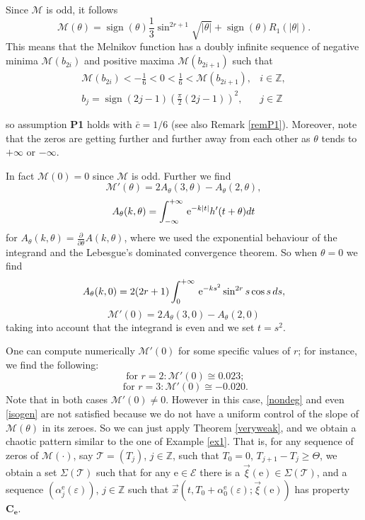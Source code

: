 \documentclass[10pt]{article}
\numberwithin{equation}{section}
\def\eu{ {\, \textrm{\rm e} }}
\def\al{\alpha}
\def\ep{\varepsilon}
\def\Z{{\mathbb Z}}
\def\ee{{\mathrm e}}
\def\EE{{\mathcal E}}
\def\MM{{\mathcal M}}
\def\TT{{\mathcal T}}
\def\xxi{\vec{\xi}}
\def\x{\vec{x}}
\DeclareMathOperator{\sign}{sign}
\def\ogap{\Theta}   %
\def\aaa{\theta}
\newcommand\assump[1]{{\rm\textbf{#1}}}
\theoremstyle{definition}
\theoremstyle{remark}
\begin{document}
Since $\mathcal{M}$ is odd, it follows
$$\mathcal{M}(\aaa)=\sign(\aaa)\frac{1}{3}\sin^{2r+1}\sqrt{|\aaa|}+\sign(\aaa)R_1(|\aaa|).$$
This means that   the Melnikov function has a doubly infinite sequence of negative minima $\MM(b_{2i})$
and positive maxima $\MM(b_{2i+1})$  such that
\begin{equation}\label{MMadd}
  \begin{array}{cc}
        \MM(b_{2i})<-\frac{1}{6}<0 <\frac{1}{6}< \MM(b_{2i+1}) ,  &  i \in \Z, \\
          b_j= \sign (2j-1)\left( \frac{\pi}{2}(2j-1)  \right)^2  ,    & j \in \Z
  \end{array}
\end{equation}

\noindent
so assumption \assump{P1} holds with $\bar{c}=1/6$     (see also Remark
\ref{remP1}).
Moreover, note that the zeros are getting further and further away from each other as $\aaa$ tends to $+\infty$ or
$-\infty$.


In fact $\MM(0)=0$ since $\MM$ is odd. Further we find
$$\MM'(\aaa)=  2A_\theta(3,\aaa)-A_\theta(2,\aaa),$$
$$A_\theta(k,\aaa)= \int_{-\infty}^{+\infty} \eu^{-k|t|} h'(t+\aaa) dt$$
for $A_\theta(k,\theta)=\frac{\partial}{\partial\theta}A(k,\theta)$,
where we used the exponential behaviour of the integrand and the  Lebesgue's dominated convergence theorem. So when
 $\aaa=0$ we find
$$A_\theta(k,0)= 2 (2r+1)\int_{0}^{+\infty} \eu^{-ks^2 }\sin^{2r}s\cos s\, ds  ,$$
 \begin{equation}\label{aprimo}
   \MM'(0)=  2A_\theta(3,0)-A_\theta(2,0)
 \end{equation}
taking into account that the integrand is even and we set $t=s^2$.

 One can compute numerically $\MM'(0)$ for some specific values of $r$; for instance, we find the following:
$$ \textrm{ for  } r=2: \MM'(0) \cong 0.023; $$
$$\textrm{ for  } r=3: \MM'(0) \cong -0.020. $$
Note that in both cases $\MM'(0) \neq 0$.
However in this case, \eqref{nondeg} and even \eqref{isogen}  are not satisfied because we do not have a uniform
control of the slope of $\MM(\aaa)$ in its zeroes.
So we can just apply Theorem \ref{veryweak}, and we
obtain a
chaotic pattern
similar to the one of Example \ref{ex1}. That is, for any sequence of zeros of   $\MM(\cdot)$, say $\TT=(T_j)$, $j\in\Z$, such that $T_0=0$,
$T_{j+1}-T_j
\ge
\ogap$, we obtain a  set $\Sigma(\TT)$ such that for any $\ee \in \EE$ there is a
$\xxi(\ee) \in \Sigma(\TT)$, and a sequence $(\al_j^\ee(\ep))$, $j\in\Z$ such that $\x(t,T_0+\al_0^\ee(\ep); \xxi(\ee))$ has property $\mathbf{C_e}$.
\end{document}

